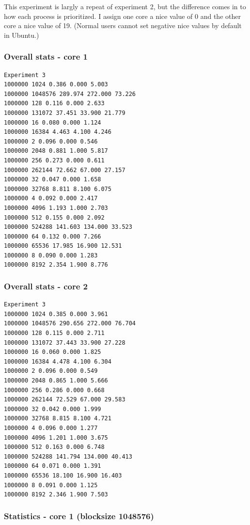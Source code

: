 \documentclass{article}
\begin{document}
This experiment is largly a repeat of experiment 2, but the difference comes in
to how each process is prioritized. I assign one core a nice value of 0 and the
other core a nice value of 19. (Normal users cannot set negative nice values by
default in Ubuntu.)

\subsubsection{Overall stats - core 1}

\begin{lstlisting}
Experiment 3
1000000 1024 0.386 0.000 5.003
1000000 1048576 289.974 272.000 73.226
1000000 128 0.116 0.000 2.633
1000000 131072 37.451 33.900 21.779
1000000 16 0.080 0.000 1.124
1000000 16384 4.463 4.100 4.246
1000000 2 0.096 0.000 0.546
1000000 2048 0.881 1.000 5.817
1000000 256 0.273 0.000 0.611
1000000 262144 72.662 67.000 27.157
1000000 32 0.047 0.000 1.658
1000000 32768 8.811 8.100 6.075
1000000 4 0.092 0.000 2.417
1000000 4096 1.193 1.000 2.703
1000000 512 0.155 0.000 2.092
1000000 524288 141.603 134.000 33.523
1000000 64 0.132 0.000 7.266
1000000 65536 17.985 16.900 12.531
1000000 8 0.090 0.000 1.283
1000000 8192 2.354 1.900 8.776
\end{lstlisting}

\subsubsection{Overall stats - core 2}

\begin{lstlisting}
Experiment 3
1000000 1024 0.385 0.000 3.961
1000000 1048576 290.656 272.000 76.704
1000000 128 0.115 0.000 2.711
1000000 131072 37.443 33.900 27.228
1000000 16 0.060 0.000 1.825
1000000 16384 4.478 4.100 6.304
1000000 2 0.096 0.000 0.549
1000000 2048 0.865 1.000 5.666
1000000 256 0.286 0.000 0.668
1000000 262144 72.529 67.000 29.583
1000000 32 0.042 0.000 1.999
1000000 32768 8.815 8.100 4.721
1000000 4 0.096 0.000 1.277
1000000 4096 1.201 1.000 3.675
1000000 512 0.163 0.000 6.748
1000000 524288 141.794 134.000 40.413
1000000 64 0.071 0.000 1.391
1000000 65536 18.100 16.900 16.403
1000000 8 0.091 0.000 1.125
1000000 8192 2.346 1.900 7.503
\end{lstlisting}

\subsubsection{Statistics - core 1 (blocksize 1048576)}
\end{document}
